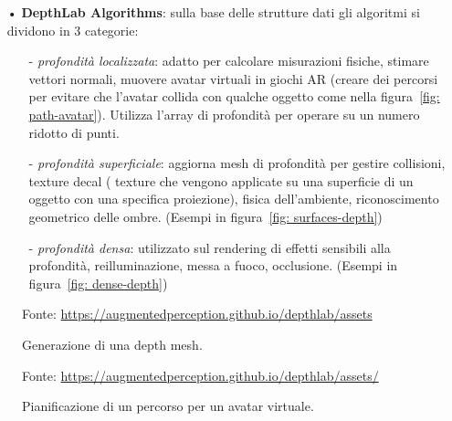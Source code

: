 \documentclass[crop=false, class=book]{standalone}
\begin{document}
\begin{itemize}
			\item[•] \textbf{DepthLab Algorithms}: sulla base delle strutture dati gli algoritmi si dividono in 3 categorie:
				\begin{itemize}
					\item[-] \emph{profondità localizzata}: adatto per calcolare misurazioni fisiche, stimare vettori normali, muovere avatar virtuali in giochi AR (creare dei percorsi per evitare che l'avatar collida con qualche oggetto come nella figura~\vref{fig: path-avatar}). Utilizza l'array di profondità per operare su un numero ridotto di punti.
					\item[-] \emph{profondità superficiale}: aggiorna mesh di profondità per gestire collisioni, texture decal ( texture che vengono applicate su una superficie di un oggetto con una specifica proiezione), fisica dell'ambiente, riconoscimento geometrico delle ombre. (Esempi in figura~\vref{fig: surfaces-depth})
					\item[-] \emph{profondità densa}: utilizzato sul rendering di effetti sensibili alla profondità, reilluminazione, messa a fuoco, occlusione. (Esempi in figura~\vref{fig: dense-depth})
				\end{itemize}
			
		\end{itemize}
					
		\begin{figure}
				\centering
				{Fonte: \url{https://augmentedperception.github.io/depthlab/assets}}
				\caption{Generazione di una depth mesh.}
				\label{fig: mesh-depth}
		\end{figure}
		
		\begin{figure}
				\centering
				{Fonte: \url{https://augmentedperception.github.io/depthlab/assets/}}
				\caption{Pianificazione di un percorso per un avatar virtuale.}
				\label{fig: path-avatar}
		\end{figure}
		
\end{document}
